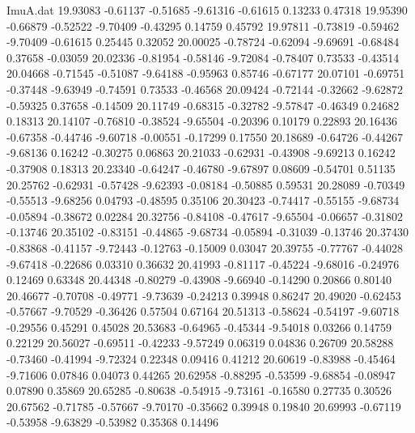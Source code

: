 \begin{filecontents}{ImuA.dat}
  19.93083   -0.61137   -0.51685   -9.61316   -0.61615    0.13233    0.47318
  19.95390   -0.66879   -0.52522   -9.70409   -0.43295    0.14759    0.45792
  19.97811   -0.73819   -0.59462   -9.70409   -0.61615    0.25445    0.32052
  20.00025   -0.78724   -0.62094   -9.69691   -0.68484    0.37658   -0.03059
  20.02336   -0.81954   -0.58146   -9.72084   -0.78407    0.73533   -0.43514
  20.04668   -0.71545   -0.51087   -9.64188   -0.95963    0.85746   -0.67177
  20.07101   -0.69751   -0.37448   -9.63949   -0.74591    0.73533   -0.46568
  20.09424   -0.72144   -0.32662   -9.62872   -0.59325    0.37658   -0.14509
  20.11749   -0.68315   -0.32782   -9.57847   -0.46349    0.24682    0.18313
  20.14107   -0.76810   -0.38524   -9.65504   -0.20396    0.10179    0.22893
  20.16436   -0.67358   -0.44746   -9.60718   -0.00551   -0.17299    0.17550
  20.18689   -0.64726   -0.44267   -9.68136    0.16242   -0.30275    0.06863
  20.21033   -0.62931   -0.43908   -9.69213    0.16242   -0.37908    0.18313
  20.23340   -0.64247   -0.46780   -9.67897    0.08609   -0.54701    0.51135
  20.25762   -0.62931   -0.57428   -9.62393   -0.08184   -0.50885    0.59531
  20.28089   -0.70349   -0.55513   -9.68256    0.04793   -0.48595    0.35106
  20.30423   -0.74417   -0.55155   -9.68734   -0.05894   -0.38672    0.02284
  20.32756   -0.84108   -0.47617   -9.65504   -0.06657   -0.31802   -0.13746
  20.35102   -0.83151   -0.44865   -9.68734   -0.05894   -0.31039   -0.13746
  20.37430   -0.83868   -0.41157   -9.72443   -0.12763   -0.15009    0.03047
  20.39755   -0.77767   -0.44028   -9.67418   -0.22686    0.03310    0.36632
  20.41993   -0.81117   -0.45224   -9.68016   -0.24976    0.12469    0.63348
  20.44348   -0.80279   -0.43908   -9.66940   -0.14290    0.20866    0.80140
  20.46677   -0.70708   -0.49771   -9.73639   -0.24213    0.39948    0.86247
  20.49020   -0.62453   -0.57667   -9.70529   -0.36426    0.57504    0.67164
  20.51313   -0.58624   -0.54197   -9.60718   -0.29556    0.45291    0.45028
  20.53683   -0.64965   -0.45344   -9.54018    0.03266    0.14759    0.22129
  20.56027   -0.69511   -0.42233   -9.57249    0.06319    0.04836    0.26709
  20.58288   -0.73460   -0.41994   -9.72324    0.22348    0.09416    0.41212
  20.60619   -0.83988   -0.45464   -9.71606    0.07846    0.04073    0.44265
  20.62958   -0.88295   -0.53599   -9.68854   -0.08947    0.07890    0.35869
  20.65285   -0.80638   -0.54915   -9.73161   -0.16580    0.27735    0.30526
  20.67562   -0.71785   -0.57667   -9.70170   -0.35662    0.39948    0.19840
  20.69993   -0.67119   -0.53958   -9.63829   -0.53982    0.35368    0.14496

\end{filecontents}
